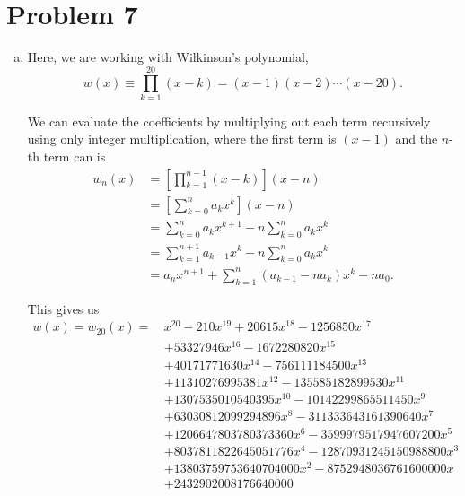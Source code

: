 \documentclass[12pt]{article}
\begin{document}
\section*{Problem 7}

\begin{enumerate}[(a)]
\item
Here, we are working with Wilkinson's polynomial,
\begin{equation*}
w(x) \equiv \prod_{k=1}^{20}(x-k) = (x-1)(x-2)\cdots(x-20).
\end{equation*}

We can evaluate the coefficients by multiplying out each term recursively using only integer multiplication, where the first term is $(x - 1)$ and the $n$-th term can is
\begin{equation*}
\begin{aligned}
w_{n}(x) &= \left[\prod_{k=1}^{n-1} (x-k)\right](x - n) \\
&= \left[\sum_{k=0}^{n} a_k x^k\right](x - n) \\
&= \sum_{k=0}^{n}a_k x^{k+1} - n\sum_{k=0}^{n}a_k x^{k} \\
&= \sum_{k=1}^{n+1}a_{k-1} x^{k} - n\sum_{k=0}^{n}a_k x^{k}\\
&= a_n x^{n+1} + \sum_{k=1}^n (a_{k-1}-n a_k)x^k -na_0.
\end{aligned}
\end{equation*}

This gives us
\begin{equation*}
\begin{aligned}
w(x) = w_{20}(x) =\,&x^{20} - 210x^{19} + 20615x^{18} - 1256850x^{17} \\
&+ 53327946x^{16} - 1672280820x^{15} \\
&+ 40171771630x^{14} - 756111184500x^{13} \\
&+ 11310276995381x^{12} - 135585182899530x^{11} \\
&+ 1307535010540395x^{10} - 10142299865511450x^{9} \\
&+ 63030812099294896x^{8} - 311333643161390640x^{7} \\
&+ 1206647803780373360x^{6} - 3599979517947607200x^{5} \\
&+ 8037811822645051776x^{4} - 12870931245150988800x^{3} \\
&+ 13803759753640704000x^{2} - 8752948036761600000x \\
&+ 2432902008176640000
\end{aligned}
\end{equation*}


\end{enumerate}
\end{document}
